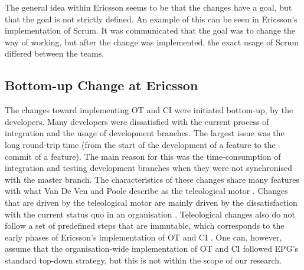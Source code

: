 \documentclass[final_report_innit.tex]{subfiles}
\begin{document}
The general idea within Ericsson seems to be that the changes have a goal, but that the goal is not strictly defined. An example of this can be seen in Ericsson’s implementation of Scrum. It was communicated that the goal was to change the way of working, but after the change was implemented, the exact usage of Scrum differed between the teams. 

\subsection{Bottom-up Change at Ericsson}
The changes toward implementing OT and CI were initiated bottom-up, by the developers. Many developers were dissatisfied with the current process of integration and the usage of development branches. The largest issue was the long round-trip time (from the start of the development of a feature to the commit of a feature). The main reason for this was the time-consumption of integration and testing development branches when they were not synchronised with the master branch. The characteristics of these changes share many features with what Van De Ven and Poole describe as the teleological motor \cite{van1995explaining}. Changes that are driven by the teleological motor are mainly driven by the dissatisfaction with the current status quo in an organisation \cite{van1995explaining}. Teleological changes also do not follow a set of predefined steps that are immutable, which corresponds to the early phases of Ericsson’s implementation of OT and CI \cite{van1995explaining}. One can, however, assume that the organisation-wide implementation of OT and CI followed EPG’s standard top-down strategy, but this is not within the scope of our research.
\end{document}
